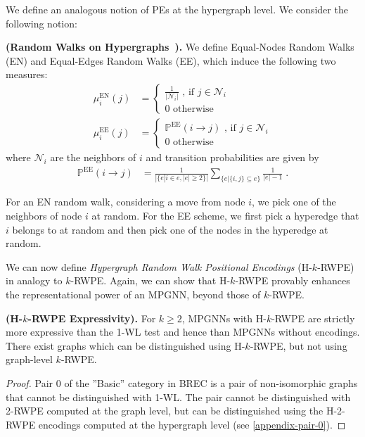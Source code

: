 We define an analogous notion of PEs at the hypergraph level. We consider the following notion:\\
\begin{defn}\label{def:hrw} \textbf{(Random Walks on Hypergraphs~\citep{coupette2022ollivier}).} 
We define Equal-Nodes Random Walks (EN) and
Equal-Edges Random Walks (EE), which induce the following two measures: 
\begin{align}\label{measures}
\mu_i^{\text{EN}}(j) & = \begin{cases} \frac{1}{|\mathcal{N}_i|} \text{ , if } j 
\in \mathcal{N}_i \\
0 \text{ otherwise} 
\end{cases}\\
\mu_i^{\text{EE}}(j) & = \begin{cases} \mathbb{P}^{\text{EE}}(i \rightarrow j)   \text{ ,} \text{ if } j 
\in \mathcal{N}_i \\
0 \text{ otherwise} 
\end{cases}
\end{align}
where $\mathcal{N}_i$ are the neighbors of $i$ and transition probabilities are given by
\begin{align*}
\mathbb{P}^{\text{EE}}(i \rightarrow j) & = \frac{1}{|\{e|i\in e, |e|\geq 2\}|} \sum_{\{e | \{i,j\} \subseteq e\}} \frac{1}{|e|-1}\; .
\end{align*}
\end{defn}

For an EN random walk, considering a move from node $i$, we pick one of the neighbors of node $i$ at random. For the EE scheme, we first pick a hyperedge that $i$ belongs to at random and then pick one of the nodes in the hyperedge at random.


We can now define \textit{Hypergraph Random Walk Positional Encodings} (H-$k$-RWPE) in analogy to $k$-RWPE. Again, we can show that H-$k$-RWPE provably enhances the representational power of an MPGNN, beyond those of $k$-RWPE.\\

\begin{theorem}\label{thm:rwpe_exp} \textbf{(H-$k$-RWPE Expressivity).} For $k \geq 2$, MPGNNs with H-$k$-RWPE are strictly more expressive than the 1-WL test and hence than MPGNNs without encodings. There exist graphs which can be distinguished using H-$k$-RWPE, but not using graph-level $k$-RWPE.
\end{theorem}

\begin{proof}
Pair $0$ of the ''Basic'' category in BREC 
is a pair of non-isomorphic graphs that cannot be distinguished with 1-WL. The pair cannot be distinguished with 2-RWPE computed at the graph level, but can be distinguished using the H-2-RWPE encodings computed at the hypergraph level (see \ref{appendix-pair-0}).
\end{proof}

